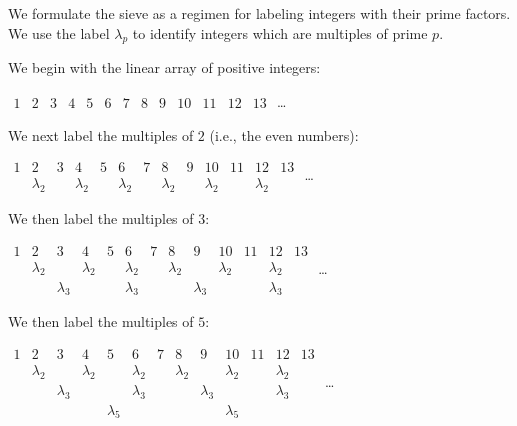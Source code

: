 \medskip

We formulate the sieve as a regimen for labeling integers with their prime factors.  We use the label $\lambda_p$ to identify integers which are multiples of prime $p$.

\medskip

We begin with the linear array of positive integers:

\smallskip

\hspace*{.25in}$\begin{array}{c|c|c|c|c|c|c|c|c|c|c|c|c}
1 & 2 & 3 & 4 & 5 & 6 & 7 & 8 & 9 & 10 & 11 & 12 & 13
\end{array}$ \ldots

\medskip

We next label the multiples of $2$ (i.e., the even numbers):

\smallskip

\hspace*{.25in}$\begin{array}{c|c|c|c|c|c|c|c|c|c|c|c|c}
1 & 2 & 3 & 4 & 5 & 6 & 7 & 8 & 9 & 10 & 11 & 12 & 13 \\
 & \lambda_2 & & \lambda_2 & & \lambda_2 & & \lambda_2 & & \lambda_2 & & \lambda_2 &
\end{array}$ \ldots

\medskip

We then label the multiples of $3$:

\smallskip

\hspace*{.25in}$\begin{array}{c|c|c|c|c|c|c|c|c|c|c|c|c}
1 & 2 & 3 & 4 & 5 & 6 & 7 & 8 & 9 & 10 & 11 & 12 & 13 \\
 & \lambda_2 & & \lambda_2 & & \lambda_2 & & \lambda_2 & & \lambda_2 & & \lambda_2 & \\
 & & \lambda_3 & &  & \lambda_3 & & & \lambda_3 & & & \lambda_3 &
\end{array}$ \ldots

\medskip

We then label the multiples of $5$:

\smallskip

\hspace*{.25in}$\begin{array}{c|c|c|c|c|c|c|c|c|c|c|c|c}
1 & 2 & 3 & 4 & 5 & 6 & 7 & 8 & 9 & 10 & 11 & 12 & 13 \\
 & \lambda_2 & & \lambda_2 & & \lambda_2 & & \lambda_2 & & \lambda_2 & & \lambda_2 & \\
 & & \lambda_3 & &  & \lambda_3 & & & \lambda_3 & & & \lambda_3 & \\
 & & & & \lambda_5 & & & & & \lambda_5 & & & 
\end{array}$ \ldots

